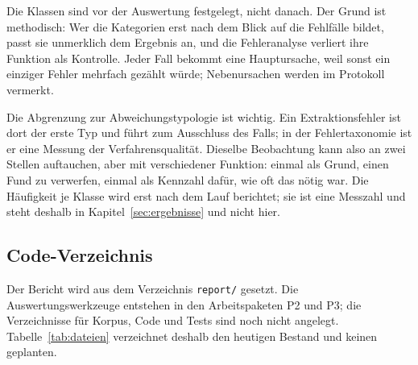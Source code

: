 Die Klassen sind vor der Auswertung festgelegt, nicht danach. Der Grund ist methodisch: Wer
die Kategorien erst nach dem Blick auf die Fehlfälle bildet, passt sie unmerklich dem
Ergebnis an, und die Fehleranalyse verliert ihre Funktion als Kontrolle. Jeder Fall bekommt
eine Hauptursache, weil sonst ein einziger Fehler mehrfach gezählt würde; Nebenursachen
werden im Protokoll vermerkt.

Die Abgrenzung zur Abweichungstypologie ist wichtig. Ein Extraktionsfehler ist dort der
erste Typ und führt zum Ausschluss des Falls; in der Fehlertaxonomie ist er eine Messung der
Verfahrensqualität. Dieselbe Beobachtung kann also an zwei Stellen auftauchen, aber mit
verschiedener Funktion: einmal als Grund, einen Fund zu verwerfen, einmal als Kennzahl
dafür, wie oft das nötig war. Die Häufigkeit je Klasse wird erst nach dem Lauf berichtet;
sie ist eine Messzahl und steht deshalb in Kapitel~\ref{sec:ergebnisse} und nicht hier.

\subsection{Code-Verzeichnis}
\label{app:code}

Der Bericht wird aus dem Verzeichnis \texttt{report/} gesetzt. Die Auswertungswerkzeuge
entstehen in den Arbeitspaketen P2 und P3; die Verzeichnisse für Korpus, Code und Tests sind
noch nicht angelegt. Tabelle~\ref{tab:dateien} verzeichnet deshalb den heutigen Bestand und
keinen geplanten.

